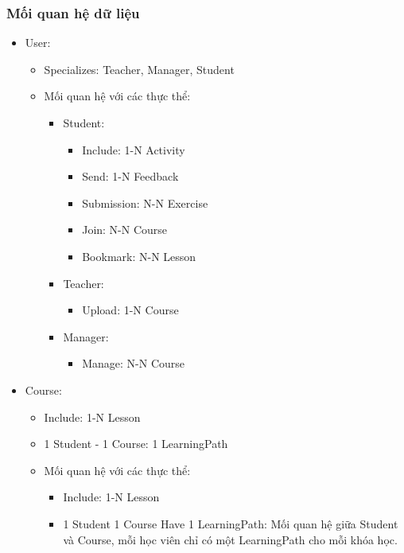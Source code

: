 \subsubsection{Mối quan hệ dữ liệu}
\begin{itemize}
    \item User:
    \begin{itemize}
        \item Specializes: Teacher, Manager, Student
        \item Mối quan hệ với các thực thể:
        \begin{itemize}
            \item Student:  
            \begin{itemize}
                \item Include: 1-N Activity
                \item Send: 1-N Feedback
                \item Submission: N-N Exercise
                \item Join: N-N Course
                \item Bookmark: N-N Lesson
            \end{itemize}
            \item Teacher:  
            \begin{itemize}
                \item Upload: 1-N Course
            \end{itemize}
            \item Manager:  
            \begin{itemize}
                \item Manage: N-N Course
            \end{itemize}
        \end{itemize}
    \end{itemize}

    \item Course:
    \begin{itemize}
        \item Include: 1-N Lesson
        \item 1 Student - 1 Course: 1 LearningPath
        \item Mối quan hệ với các thực thể:
        \begin{itemize}
            \item Include: 1-N Lesson
            \item 1 Student 1 Course Have 1 LearningPath: Mối quan hệ giữa Student và Course, mỗi học viên chỉ có một LearningPath cho mỗi khóa học.
        \end{itemize}
    \end{itemize}


\end{itemize}
